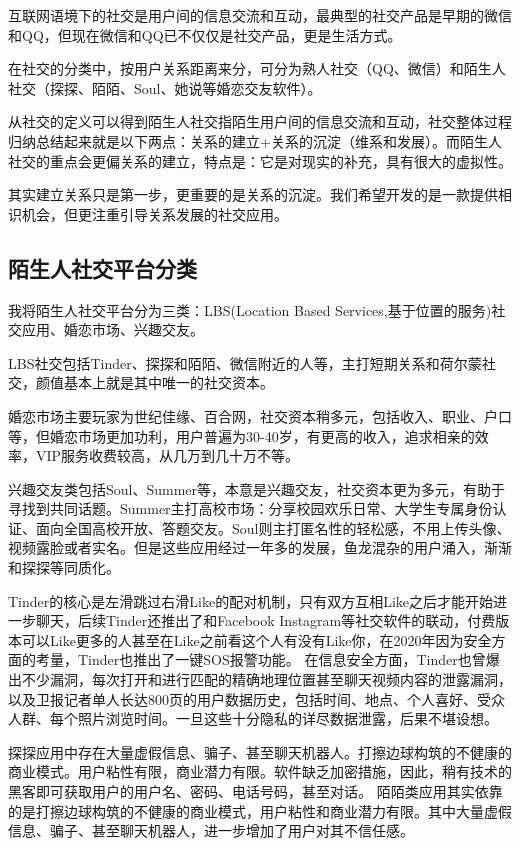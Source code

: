 \documentclass[UTF8]{ctexart}
\begin{document}
\begin{tcolorbox}
    互联网语境下的社交是用户间的信息交流和互动，最典型的社交产品是早期的微信和QQ，但现在微信和QQ已不仅仅是社交产品，更是生活方式。

    在社交的分类中，按用户关系距离来分，可分为熟人社交（QQ、微信）和陌生人社交（探探、陌陌、Soul、她说等婚恋交友软件）。

    从社交的定义可以得到陌生人社交指陌生用户间的信息交流和互动，社交整体过程归纳总结起来就是以下两点：关系的建立+关系的沉淀（维系和发展）。而陌生人社交的重点会更偏关系的建立，特点是：它是对现实的补充，具有很大的虚拟性。\cite{StrangerDefine}
\end{tcolorbox}

其实建立关系只是第一步，更重要的是关系的沉淀。我们希望开发的是一款提供相识机会，但更注重引导关系发展的社交应用。

\subsection{陌生人社交平台分类}
我将陌生人社交平台分为三类：LBS(Location Based Services,基于位置的服务)社交应用、婚恋市场、兴趣交友。

LBS社交包括Tinder、探探和陌陌、微信附近的人等，主打短期关系和荷尔蒙社交，颜值基本上就是其中唯一的社交资本。

婚恋市场主要玩家为世纪佳缘、百合网，社交资本稍多元，包括收入、职业、户口等，但婚恋市场更加功利，用户普遍为30-40岁，有更高的收入，追求相亲的效率，VIP服务收费较高，从几万到几十万不等。

兴趣交友类包括Soul、Summer等，本意是兴趣交友，社交资本更为多元，有助于寻找到共同话题。Summer主打高校市场：分享校园欢乐日常、大学生专属身份认证、面向全国高校开放、答题交友。Soul则主打匿名性的轻松感，不用上传头像、视频露脸或者实名。但是这些应用经过一年多的发展，鱼龙混杂的用户涌入，渐渐和探探等同质化。

Tinder的核心是左滑跳过右滑Like的配对机制，只有双方互相Like之后才能开始进一步聊天，后续Tinder还推出了和Facebook Instagram等社交软件的联动，付费版本可以Like更多的人甚至在Like之前看这个人有没有Like你，在2020年因为安全方面的考量，Tinder也推出了一键SOS报警功能。\cite{WikiTinderFeatures}
在信息安全方面，Tinder也曾爆出不少漏洞，每次打开和进行匹配的精确地理位置甚至聊天视频内容的泄露漏洞，以及卫报记者单人长达800页的用户数据历史，包括时间、地点、个人喜好、受众人群、每个照片浏览时间。一旦这些十分隐私的详尽数据泄露，后果不堪设想。\cite{WikiTinderFeatures}

探探应用中存在大量虚假信息、骗子、甚至聊天机器人。打擦边球构筑的不健康的商业模式。用户粘性有限，商业潜力有限。软件缺乏加密措施，因此，稍有技术的黑客即可获取用户的用户名、密码、电话号码，甚至对话。\cite{WikiTantan}
陌陌类应用其实依靠的是打擦边球构筑的不健康的商业模式，用户粘性和商业潜力有限。其中大量虚假信息、骗子、甚至聊天机器人，进一步增加了用户对其不信任感。\cite{MoMoWhy}
\end{document}
